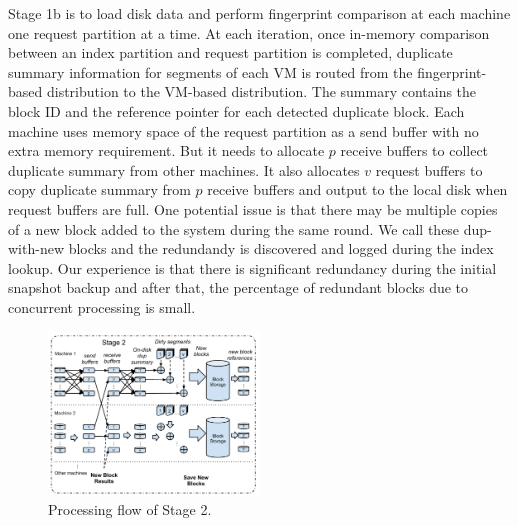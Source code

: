 Stage 1b is to load disk data and perform fingerprint comparison at each machine one request partition at a time.
At each iteration, once in-memory comparison between an index partition and request partition is completed,  
duplicate summary information for segments of each VM is routed from the fingerprint-based distribution  to the
VM-based distribution.  The summary contains the block ID and  the reference pointer for each detected duplicate block.   
Each machine uses memory space of the request partition as a send buffer with no extra memory requirement.
But it needs to allocate $p$ receive buffers to collect duplicate summary from other machines.
It also allocates $v$ request buffers to copy duplicate summary from $p$ receive buffers and output to the local disk
when request buffers are full. One potential issue is that there may be
multiple copies of a new block added to the system during the same round.
We call these dup-with-new blocks and the redundandy is discovered and
logged during the index lookup.
Our experience is that there is significant redundancy during the initial snapshot backup and after
that, the percentage of redundant blocks due to concurrent processing  is small.

\begin{figure}[th]
\centering
\includegraphics[width=0.5\textwidth]{images/Stage2.pdf}
\caption{Processing flow of Stage 2.}
\label{fig:stage2}
\end{figure}

